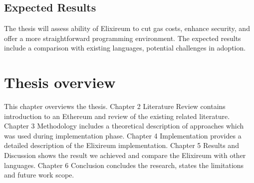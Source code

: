 \subsection{Expected Results}
The thesis will assess ability of Elixireum to cut gas costs, enhance security, and offer a more straightforward programming environment. The expected results include a comparison with existing languages, potential challenges in adoption.

\section{Thesis overview}

This chapter overviews the thesis. Chapter 2 Literature Review contains introduction to an Ethereum and review of the existing related literature. Chapter 3 Methodology includes a theoretical description of approaches which was used during implementation phase. Chapter 4 Implementation provides a detailed description of the Elixireum implementation. Chapter 5 Results and Discussion shows the result we achieved and compare the Elixireum with other languages. Chapter 6 Conclusion concludes the research, states the limitations and future work scope.




